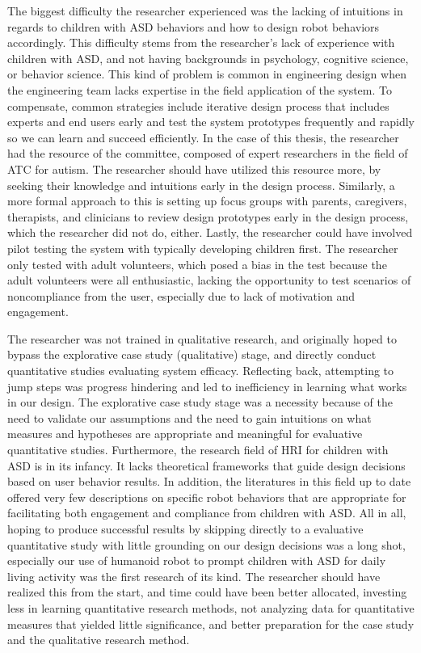 The biggest difficulty the researcher experienced was the lacking of intuitions in regards to children with ASD behaviors and how to design robot behaviors accordingly.  This difficulty stems from the researcher's lack of experience with children with ASD, and not having backgrounds in psychology, cognitive science, or behavior science.  This kind of problem is common in engineering design when the engineering team lacks expertise in the field application of the system.  To compensate, common strategies include iterative design process that includes experts and end users early and test the system prototypes frequently and rapidly so we can learn and succeed efficiently.  In the case of this thesis, the researcher had the resource of the committee, composed of expert researchers in the field of ATC for autism.  The researcher should have utilized this resource more, by seeking their knowledge and intuitions early in the design process.  Similarly, a more formal approach to this is setting up focus groups with parents, caregivers, therapists, and clinicians to review design prototypes early in the design process, which the researcher did not do, either.  Lastly, the researcher could have involved pilot testing the system with typically developing children first.  The researcher only tested with adult volunteers, which posed a bias in the test because the adult volunteers were all enthusiastic, lacking the opportunity to test scenarios of noncompliance from the user, especially due to lack of motivation and engagement.

The researcher was not trained in qualitative research, and originally hoped to bypass the explorative case study (qualitative) stage, and directly conduct quantitative studies evaluating system efficacy.  Reflecting back, attempting to jump steps was progress hindering and led to inefficiency in learning what works in our design.  The explorative case study stage was a necessity because of the need to validate our assumptions and the need to gain intuitions on what measures and hypotheses are appropriate and meaningful for evaluative quantitative studies.  Furthermore, the research field of HRI for children with ASD is in its infancy.  It lacks theoretical frameworks that guide design decisions based on user behavior results.  In addition, the literatures in this field up to date offered very few descriptions on specific robot behaviors that are appropriate for facilitating both engagement and compliance from children with ASD.  All in all, hoping to produce successful results by skipping directly to a evaluative quantitative study with little grounding on our design decisions was a long shot, especially our use of humanoid robot to prompt children with ASD for daily living activity was the first research of its kind.  The researcher should have realized this from the start, and time could have been better allocated, investing less in learning quantitative research methods, not analyzing data for quantitative measures that yielded little significance, and better preparation for the case study and the qualitative research method.


